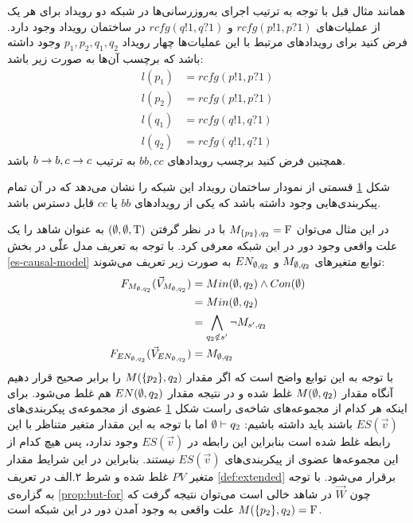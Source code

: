 همانند مثال قبل با توجه به ترتیب اجرای به‌روز‌رسانی‌ها در شبکه دو رویداد برای هر یک از عملیات‌های
$rcfg(p!1,p?1)$
و
$rcfg(q!1,q?1)$
در ساختمان رویداد وجود دارد.
فرض کنید برای رویداد‌های مرتبط با این عملیات‌ها چهار رویداد
$p_1,p_2,q_1,q_2$
وجود داشته باشد که برچسب آن‌ها به صورت زیر باشد:
\begin{align*}
    l(p_1) & = rcfg(p!1,p?1) \\
    l(p_2) & = rcfg(p!1,p?1) \\
    l(q_1) & = rcfg(q!1,q?1) \\
    l(q_2) & = rcfg(q!1,q?1)
\end{align*}
همچنین فرض کنید برچسب رویداد‌های
$bb,cc$
به ترتیب
$b\rightarrow b,c\rightarrow c$
باشد.
\begin{figure}
    \centering
    \caption{}
    \label{fig:loop:es}
\end{figure}
شکل
\ref{fig:loop:es}
قسمتی از نمودار ساختمان رویداد این شبکه را نشان می‌دهد که در آن تمام پیکر‌بندی‌هایی وجود داشته باشد که یکی از رویداد‌های
$bb$
یا
$cc$
قابل دسترس باشد.

در این مثال می‌توان
$M_{\{p_2\},q_2}= \mathrm{F}$
با در نظر گرفتن
$(\emptyset,\emptyset,\mathrm{T})$
به عنوان شاهد را یک علت واقعی وجود دور در این شبکه
معرفی کرد.
با توجه به تعریف مدل علّی در بخش
\ref{es-causal-model}
توابع متغیر‌های
$M_{\emptyset,q_2}$
و
$EN_{\emptyset,q_2}$
به صورت زیر تعریف می‌شوند:
\begin{align*}
    F_{M_{\emptyset,q_2}}(\vec V_{M_{\emptyset,q_2}})  & = Min(\emptyset,q_2) \wedge Con(\emptyset) \\
                    & = Min(\emptyset,q_2)                \\
                    & =  \bigwedge_{q_2 \notin s'}
    \neg M_{s',q_2}                                \\
    F_{EN_{\emptyset,q_2}}(\vec V_{EN_{\emptyset,q_2}}) & = M_{\emptyset,q_2}
\end{align*}
با توجه به این توابع واضح است که 
اگر مقدار
$M(\{p_2\},q_2)$
را برابر صحیح قرار دهیم آنگاه مقدار
$M(\emptyset,q_2)$
غلط شده و در نتیجه مقدار
$EN(\emptyset,q_2)$
هم غلط می‌شود.
برای اینکه هر کدام از مجموعه‌های شاخه‌ی راست شکل
\ref{fig:loop:es}
عضوی از مجموعه‌ی پیکربندی‌های 
$ES(\vec v)$
باشند باید داشته باشیم:
$\emptyset \vdash q_2$
اما با توجه به این مقدار متغیر متناظر با این رابطه غلط شده است بنابراین این رابطه در 
$ES(\vec v)$
وجود ندارد، پس هیچ کدام از این مجموعه‌ها عضوی از پیکربندی‌های 
$ES(\vec v)$
نیستند.
بنابراین در این شرایط مقدار متغیر 
$PV$
غلط شده و شرط ۲.الف در تعریف 
\ref{def:extended}
برقرار می‌شود.
با توجه به گزاره‌ی 
\ref{prop:but-for}
چون
$\vec W$
در شاهد خالی است می‌توان نتیجه گرفت که
$M(\{p_2\},q_2) = \mathrm{F}$
علت واقعی به وجود آمدن دور در این شبکه است.
